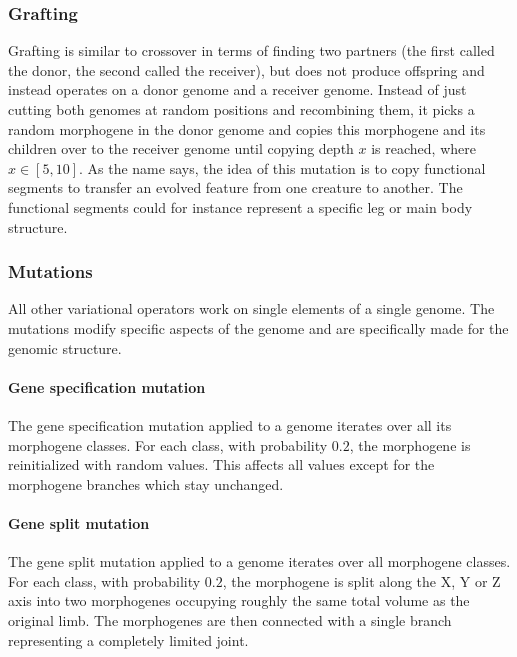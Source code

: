 \documentclass[main]{subfiles}
\begin{document}
\subsubsection{Grafting}

Grafting is similar to crossover in terms of finding two partners (the first called the donor, the second called the receiver), but does not produce offspring and instead operates on a donor genome and a receiver genome. Instead of just cutting both genomes at random positions and recombining them, it picks a random morphogene in the donor genome and copies this morphogene and its children over to the receiver genome until copying depth $x$ is reached, where $x \in [5,10]$. As the name says, the idea of this mutation is to copy functional segments to transfer an evolved feature from one creature to another. The functional segments could for instance represent a specific leg or main body structure.

\subsubsection{Mutations}

All other variational operators work on single elements of a single genome. The mutations modify specific aspects of the genome and are specifically made for the genomic structure.

\paragraph{Gene specification mutation}

The gene specification mutation applied to a genome iterates over all its morphogene classes. For each class, with probability $0.2$, the morphogene is reinitialized with random values. This affects all values except for the morphogene branches which stay unchanged.

\paragraph{Gene split mutation}

The gene split mutation applied to a genome iterates over all morphogene classes. For each class, with probability $0.2$, the morphogene is split along the X, Y or Z axis into two morphogenes occupying roughly the same total volume as the original limb. The morphogenes are then connected with a single branch representing a completely limited joint.
\end{document}
